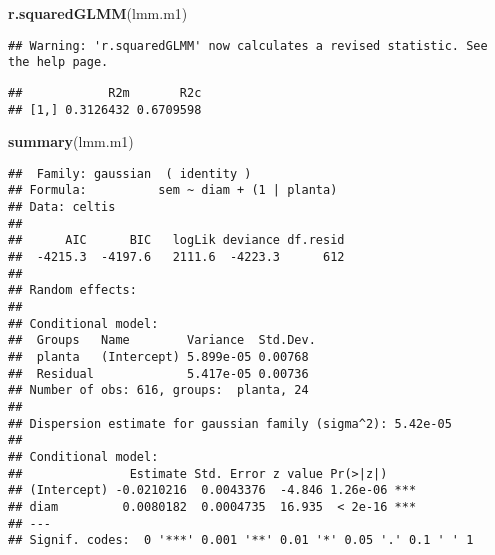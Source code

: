 \documentclass[
]{book}
\newenvironment{Shaded}{\begin{snugshade}}{\end{snugshade}}
\newcommand{\KeywordTok}[1]{\textcolor[rgb]{0.13,0.29,0.53}{\textbf{#1}}}
\newcommand{\NormalTok}[1]{#1}
\begin{document}
\begin{Shaded}
\begin{Highlighting}[]
\KeywordTok{r.squaredGLMM}\NormalTok{(lmm.m1)}
\end{Highlighting}
\end{Shaded}

\begin{verbatim}
## Warning: 'r.squaredGLMM' now calculates a revised statistic. See the help page.
\end{verbatim}

\begin{verbatim}
##            R2m       R2c
## [1,] 0.3126432 0.6709598
\end{verbatim}

\begin{Shaded}
\begin{Highlighting}[]
\KeywordTok{summary}\NormalTok{(lmm.m1)}
\end{Highlighting}
\end{Shaded}

\begin{verbatim}
##  Family: gaussian  ( identity )
## Formula:          sem ~ diam + (1 | planta)
## Data: celtis
## 
##      AIC      BIC   logLik deviance df.resid 
##  -4215.3  -4197.6   2111.6  -4223.3      612 
## 
## Random effects:
## 
## Conditional model:
##  Groups   Name        Variance  Std.Dev.
##  planta   (Intercept) 5.899e-05 0.00768 
##  Residual             5.417e-05 0.00736 
## Number of obs: 616, groups:  planta, 24
## 
## Dispersion estimate for gaussian family (sigma^2): 5.42e-05 
## 
## Conditional model:
##               Estimate Std. Error z value Pr(>|z|)    
## (Intercept) -0.0210216  0.0043376  -4.846 1.26e-06 ***
## diam         0.0080182  0.0004735  16.935  < 2e-16 ***
## ---
## Signif. codes:  0 '***' 0.001 '**' 0.01 '*' 0.05 '.' 0.1 ' ' 1
\end{verbatim}
\end{document}
